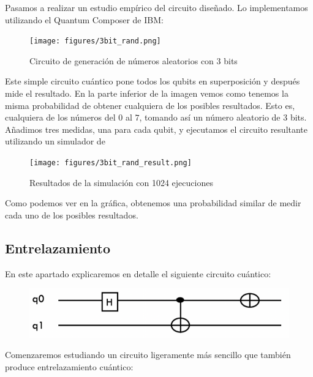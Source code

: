 \documentclass[11pt]{article}
\begin{document}
Pasamos a realizar un estudio empírico del circuito diseñado. Lo implementamos utilizando el Quantum Composer de IBM:

\begin{figure}[H]
	\centering
	\texttt{[image: figures/3bit\_rand.png]}
	\caption{Circuito de generación de números aleatorios con 3 bits}
\end{figure}

Este simple circuito cuántico pone todos los qubits en superposición y después mide el resultado. En la parte inferior de la imagen vemos como tenemos la misma probabilidad de obtener cualquiera de los posibles resultados. Esto es, cualquiera de los números del $0$ al $7$, tomando así un número aleatorio de 3 bits. Añadimos tres medidas, una para cada qubit, y ejecutamos el circuito resultante utilizando un simulador de 

\begin{figure}[H]
	\centering
	\texttt{[image: figures/3bit\_rand\_result.png]}
	\caption{Resultados de la simulación con 1024 ejecuciones}
\end{figure}

Como podemos ver en la gráfica, obtenemos una probabilidad similar de medir cada uno de los posibles resultados.

\subsection{Entrelazamiento}

En este apartado explicaremos en detalle el siguiente circuito cuántico:

\begin{figure}[H]
	\centering
	\includegraphics[scale=0.8]{figures/entanglement_statement.png}
\end{figure}

Comenzaremos estudiando un circuito ligeramente más sencillo que también produce entrelazamiento cuántico:
\end{document}
